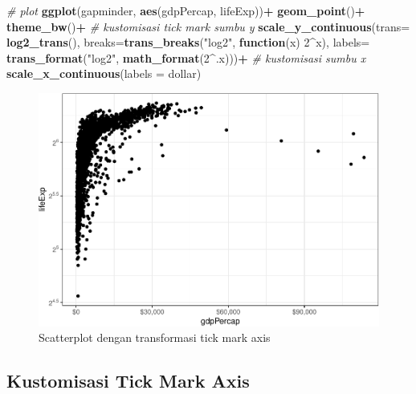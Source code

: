 \documentclass[]{book}
\newenvironment{Shaded}{\begin{snugshade}}{\end{snugshade}}
\newcommand{\KeywordTok}[1]{\textcolor[rgb]{0.13,0.29,0.53}{\textbf{#1}}}
\newcommand{\DataTypeTok}[1]{\textcolor[rgb]{0.13,0.29,0.53}{#1}}
\newcommand{\DecValTok}[1]{\textcolor[rgb]{0.00,0.00,0.81}{#1}}
\newcommand{\StringTok}[1]{\textcolor[rgb]{0.31,0.60,0.02}{#1}}
\newcommand{\CommentTok}[1]{\textcolor[rgb]{0.56,0.35,0.01}{\textit{#1}}}
\newcommand{\ControlFlowTok}[1]{\textcolor[rgb]{0.13,0.29,0.53}{\textbf{#1}}}
\newcommand{\OperatorTok}[1]{\textcolor[rgb]{0.81,0.36,0.00}{\textbf{#1}}}
\newcommand{\NormalTok}[1]{#1}
\begin{document}
\begin{Shaded}
\begin{Highlighting}[]
\CommentTok{# plot}
\KeywordTok{ggplot}\NormalTok{(gapminder, }\KeywordTok{aes}\NormalTok{(gdpPercap, lifeExp))}\OperatorTok{+}
\StringTok{  }\KeywordTok{geom_point}\NormalTok{()}\OperatorTok{+}
\StringTok{  }\KeywordTok{theme_bw}\NormalTok{()}\OperatorTok{+}
\StringTok{  }\CommentTok{# kustomisasi tick mark sumbu y}
\StringTok{  }\KeywordTok{scale_y_continuous}\NormalTok{(}\DataTypeTok{trans=} \KeywordTok{log2_trans}\NormalTok{(),}
                     \DataTypeTok{breaks=}\KeywordTok{trans_breaks}\NormalTok{(}\StringTok{"log2"}\NormalTok{, }\ControlFlowTok{function}\NormalTok{(x) }\DecValTok{2}\OperatorTok{^}\NormalTok{x),}
                     \DataTypeTok{labels=} \KeywordTok{trans_format}\NormalTok{(}\StringTok{"log2"}\NormalTok{, }\KeywordTok{math_format}\NormalTok{(}\DecValTok{2}\OperatorTok{^}\NormalTok{.x)))}\OperatorTok{+}
\StringTok{  }\CommentTok{# kustomisasi sumbu x}
\StringTok{  }\KeywordTok{scale_x_continuous}\NormalTok{(}\DataTypeTok{labels =}\NormalTok{ dollar)}
\end{Highlighting}
\end{Shaded}

\begin{figure}

{\centering \includegraphics[width=0.7\linewidth]{EnvStat_files/figure-latex/gglimits4-1} 

}

\caption{Scatterplot dengan transformasi tick mark axis }\label{fig:gglimits4}
\end{figure}

\subsection{Kustomisasi Tick Mark
Axis}\label{kustomisasi-tick-mark-axis}
\end{document}
